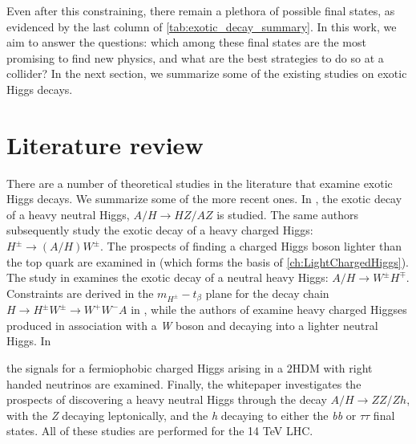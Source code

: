 Even after this constraining, there remain a plethora of possible final states, as evidenced by the last column of \autoref{tab:exotic_decay_summary}. In this work, we aim to answer the questions: which among these final states are the most promising to find new physics, and what are the best strategies to do so at a collider? In the next section, we summarize some of the existing studies on exotic Higgs decays.

\section{Literature review}\label{sec:literature_review}
There are a number of theoretical studies in the literature that examine exotic Higgs decays. We summarize some of the more recent ones. In \cite{Coleppa:2014hxa}, the exotic decay of a heavy neutral Higgs, $A/H\rightarrow HZ/AZ$ is studied. The same authors subsequently study the exotic decay of a heavy charged Higgs: $H^\pm\rightarrow (A/H)W^\pm$. The prospects of finding a charged Higgs boson lighter than the top quark are examined in \cite{Kling:2015uba} (which forms the basis of \autoref{ch:LightChargedHiggs}). The study in \cite{Li:2015lra} examines the exotic decay of a neutral heavy Higgs: $A/H\rightarrow W^\pm H^\mp$. Constraints are derived in the $m_{H^\pm}-t_\beta$ plane for the decay chain $H\rightarrow H^\pm W^\pm\rightarrow W^+W^- A$ in \cite{Dermisek:2013cxa}, while the authors of \cite{Basso:2012st} examine heavy charged Higgses produced in association with a \emph{W} boson and decaying into a lighter neutral Higgs. In {\cite{Maitra:2014qea} the signals for a fermiophobic charged Higgs arising in a $2$HDM with right handed neutrinos are examined. Finally, the whitepaper \cite{Brownson:2013lka} investigates the prospects of discovering a heavy neutral Higgs through the decay $A/H\rightarrow ZZ/Zh$, with the \emph{Z} decaying leptonically, and the \emph{h} decaying to either the \emph{bb} or $\tau\tau$ final states. All of these studies are performed for the 14 TeV LHC.

}
